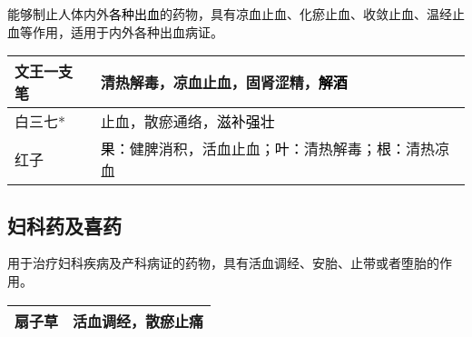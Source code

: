 \documentclass[cn,black,12pt,normal,founder]{elegantnote}
\newcommand{\redt}[1]{\textcolor{black}{{}#1}}      %
\begin{document}
能够制止人体内外\redt{各种出血}的药物，具有凉血止血、化瘀止血、收敛止血、温经止血等作用，适用于内外各种出血病证。

\begin{table}[H]
  \begin{tabular}{|l|l|}
  \hline
  文王一支笔 & 清热解毒，凉血止血，固肾涩精，\redt{解酒}    \\ \hline
  白三七* & 止血，散瘀通络，\redt{滋补强壮}   \\   \hline
  红子 & \redt{果：}健脾消积，活血止血；\redt{叶：}清热解毒；\redt{根：}清热凉血  \\  \hline
  \end{tabular}
\end{table}

\subsection{妇科药及喜药}

用于治疗妇科疾病及产科病证的药物，具有活血调经、安胎、止带或者堕胎的作用。

\begin{table}[H]
  \begin{tabular}{|l|l|}
  \hline
  扇子草 & 活血调经，散瘀止痛 \\ \hline
  \end{tabular}
\end{table}
\end{document}
